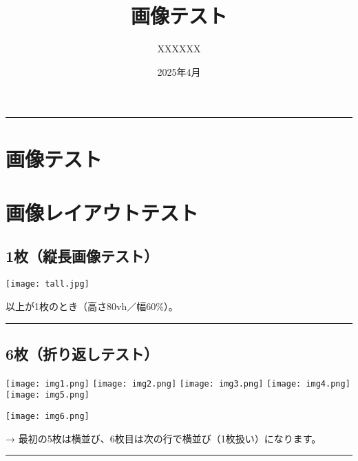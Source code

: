 \documentclass[
]{article}
\title{画像テスト}
\author{XXXXXX}
\date{2025年4月}
\makeatletter
\renewcommand{\maketitle}{
  \begin{center}
    {\LARGE\bfseries \@title \par}
    \vspace{1em}
    {\large \@author \par}
    \vspace{0.5em}
    {\small \@date \par}
    \vspace{1em}
    \rule{\linewidth}{0.5pt}
  \end{center}
}
\makeatother
\begin{document}
\maketitle

\section{画像テスト}\label{ux753bux50cfux30c6ux30b9ux30c8}

\section{画像レイアウトテスト}\label{ux753bux50cfux30ecux30a4ux30a2ux30a6ux30c8ux30c6ux30b9ux30c8}

\subsection{1枚（縦長画像テスト）}\label{ux679aux7e26ux9577ux753bux50cfux30c6ux30b9ux30c8}

\begin{center}
\texttt{[image: tall.jpg]}
\end{center}

以上が1枚のとき（高さ80vh／幅60\%）。

\begin{center}\rule{0.5\linewidth}{0.5pt}\end{center}

\subsection{6枚（折り返しテスト）}\label{ux679aux6298ux308aux8fd4ux3057ux30c6ux30b9ux30c8}

\begin{center}
\texttt{[image: img1.png]}
\texttt{[image: img2.png]}
\texttt{[image: img3.png]}
\texttt{[image: img4.png]}
\texttt{[image: img5.png]}
\end{center}

\begin{center}
\texttt{[image: img6.png]}
\end{center}

→ 最初の5枚は横並び、6枚目は次の行で横並び（1枚扱い）になります。

\begin{center}\rule{0.5\linewidth}{0.5pt}\end{center}
\end{document}
